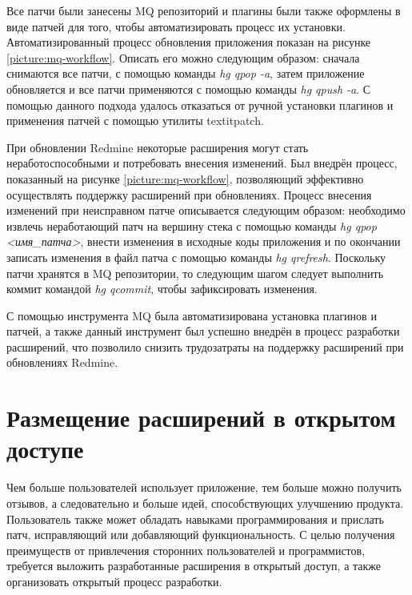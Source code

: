 Все патчи были занесены MQ репозиторий и плагины были также оформлены в виде
патчей для того, чтобы автоматизировать процесс их установки.
Автоматизированный процесс обновления приложения показан на рисунке
\ref{picture:mq-workflow}. Описать его можно следующим образом: сначала
снимаются все патчи, с помощью команды \textit{hg qpop -a}, затем приложение
обновляется и все патчи применяются с помощью команды \textit{hg qpush -a}. С
помощью данного подхода удалось отказаться от ручной установки плагинов и
применения патчей с помощью утилиты textit{patch}.

При обновлении Redmine некоторые расширения могут стать неработоспособными и
потребовать внесения изменений. Был внедрён процесс, показанный на рисунке
\ref{picture:mq-workflow}, позволяющий эффективно осуществлять поддержку
расширений при обновлениях. Процесс внесения изменений при неисправном патче
описывается следующим образом: необходимо извлечь неработающий патч на вершину
стека с помощью команды \textit{hg qpop <имя\_патча>}, внести изменения в
исходные коды приложения и по окончании записать изменения в файл патча с
помощью команды \textit{hg qrefresh}. Поскольку патчи хранятся в MQ
репозитории, то следующим шагом следует выполнить коммит командой \textit{hg
qcommit}, чтобы зафиксировать изменения.

С помощью инструмента MQ была автоматизирована установка плагинов и патчей, а
также данный инструмент был успешно внедрён в процесс разработки расширений,
что позволило снизить трудозатраты на поддержку расширений при обновлениях
Redmine.

\section{Размещение расширений в открытом доступе}
Чем больше пользователей использует приложение, тем больше можно получить
отзывов, а следовательно и больше идей, способствующих улучшению продукта.
Пользователь также может обладать навыками программирования и прислать патч,
исправляющий или добавляющий функциональность. С целью получения преимуществ от
привлечения сторонних пользователей и программистов, требуется выложить
разработанные расширения в открытый доступ, а также организовать открытый
процесс разработки.


